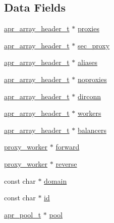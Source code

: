 \subsection*{Data Fields}
\begin{DoxyCompactItemize}
\item 
\hyperlink{structapr__array__header__t}{apr\+\_\+array\+\_\+header\+\_\+t} $\ast$ \hyperlink{structproxy__server__conf_a3ca8897377c59e7506d05531c6079018}{proxies}
\item 
\hyperlink{structapr__array__header__t}{apr\+\_\+array\+\_\+header\+\_\+t} $\ast$ \hyperlink{structproxy__server__conf_a4c5487eb5c442f28acc6314e70e4f078}{sec\+\_\+proxy}
\item 
\hyperlink{structapr__array__header__t}{apr\+\_\+array\+\_\+header\+\_\+t} $\ast$ \hyperlink{structproxy__server__conf_a31e08b1678de460f1b1b7454ca6bfac9}{aliases}
\item 
\hyperlink{structapr__array__header__t}{apr\+\_\+array\+\_\+header\+\_\+t} $\ast$ \hyperlink{structproxy__server__conf_af95d22b2060b6824b7efb6381901dfaf}{noproxies}
\item 
\hyperlink{structapr__array__header__t}{apr\+\_\+array\+\_\+header\+\_\+t} $\ast$ \hyperlink{structproxy__server__conf_aa9cd9dd3eec8bfaf2a318b452170875d}{dirconn}
\item 
\hyperlink{structapr__array__header__t}{apr\+\_\+array\+\_\+header\+\_\+t} $\ast$ \hyperlink{structproxy__server__conf_a233902252764d689aac3aa47b1af406c}{workers}
\item 
\hyperlink{structapr__array__header__t}{apr\+\_\+array\+\_\+header\+\_\+t} $\ast$ \hyperlink{structproxy__server__conf_ad832f022473a1a4368b989d29f0da7fb}{balancers}
\item 
\hyperlink{structproxy__worker}{proxy\+\_\+worker} $\ast$ \hyperlink{structproxy__server__conf_a47d373ba84d9c22dd2d9174986713075}{forward}
\item 
\hyperlink{structproxy__worker}{proxy\+\_\+worker} $\ast$ \hyperlink{structproxy__server__conf_ae0a3db9ba4e12ecd0c1f0c664d2fc0bd}{reverse}
\item 
const char $\ast$ \hyperlink{structproxy__server__conf_a538c9685b0bfafc8e70a8a750683e4bb}{domain}
\item 
const char $\ast$ \hyperlink{structproxy__server__conf_a27481d3523983c944163fa97cd2b95d7}{id}
\item 
\hyperlink{structapr__pool__t}{apr\+\_\+pool\+\_\+t} $\ast$ \hyperlink{structproxy__server__conf_a951dd1f1aae28794459fd5cefa52675f}{pool}
\item 

\end{DoxyCompactItemize}
